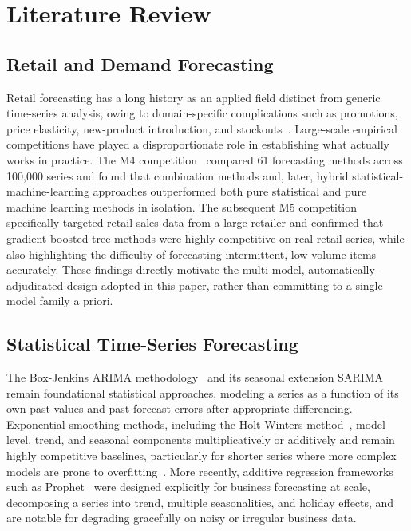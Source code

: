 \section{Literature Review}
\label{sec:literature}

\subsection{Retail and Demand Forecasting}
Retail forecasting has a long history as an applied field distinct from generic time-series analysis, owing to domain-specific complications such as promotions, price elasticity, new-product introduction, and stockouts~\cite{fildes2022retail,ord2017principles}. Large-scale empirical competitions have played a disproportionate role in establishing what actually works in practice. The M4 competition~\cite{makridakis2020m4} compared 61 forecasting methods across 100{,}000 series and found that combination methods and, later, hybrid statistical-machine-learning approaches outperformed both pure statistical and pure machine learning methods in isolation. The subsequent M5 competition~\cite{makridakis2022m5} specifically targeted retail sales data from a large retailer and confirmed that gradient-boosted tree methods were highly competitive on real retail series, while also highlighting the difficulty of forecasting intermittent, low-volume items accurately. These findings directly motivate the multi-model, automatically-adjudicated design adopted in this paper, rather than committing to a single model family a priori.

\subsection{Statistical Time-Series Forecasting}
The Box-Jenkins ARIMA methodology~\cite{boxjenkins1970} and its seasonal extension SARIMA remain foundational statistical approaches, modeling a series as a function of its own past values and past forecast errors after appropriate differencing. Exponential smoothing methods, including the Holt-Winters method~\cite{winters1960holtwinters}, model level, trend, and seasonal components multiplicatively or additively and remain highly competitive baselines, particularly for shorter series where more complex models are prone to overfitting~\cite{hyndman2018forecasting,makridakis1998forecasting}. More recently, additive regression frameworks such as Prophet~\cite{taylor2018prophet} were designed explicitly for business forecasting at scale, decomposing a series into trend, multiple seasonalities, and holiday effects, and are notable for degrading gracefully on noisy or irregular business data.

